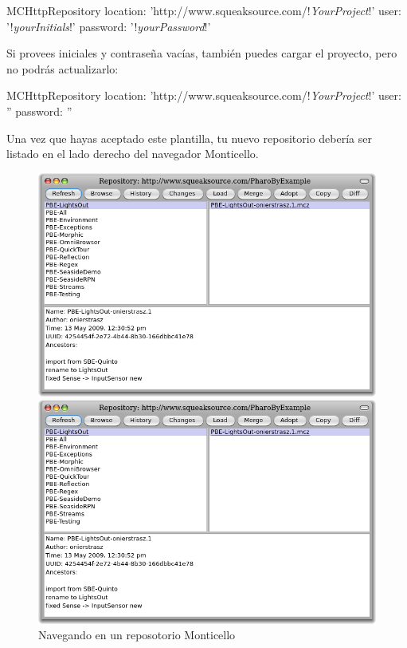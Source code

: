 \documentclass[a4paper,10pt,twoside]{book}
\begin{document}
\begin{code}{}
MCHttpRepository 
    location: 'http://www.squeaksource.com/!\emph{YourProject}!'
    user: '!\emph{yourInitials}!' 
    password: '!\emph{yourPassword}!'
\end{code}   

\noindent
Si provees iniciales y contrase\~na vac\'ias, tambi\'en puedes cargar el proyecto, pero no podr\'as actualizarlo:

\begin{code}{}
MCHttpRepository 
    location: 'http://www.squeaksource.com/!\emph{YourProject}!'
    user: '' 
    password: ''
\end{code}   

Una vez que hayas aceptado este plantilla, tu nuevo repositorio deber\'ia ser listado en el lado derecho del navegador Monticello. 

\begin{figure}[hbt]
\ifluluelse
	{\centerline {\includegraphics[width=\textwidth]{BrowseRepository}}}
	{\centerline {\includegraphics[scale=0.7]{BrowseRepository}}}
\caption{Navegando en un reposotorio Monticello
}
\end{figure}
\end{document}

